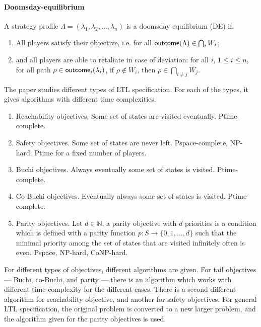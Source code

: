 \documentclass[format=acmsmall, review=false]{acmart}
\newcommand{\outcome}{\textnormal{\textsf{outcome}}}
\newcommand{\nat}{\mathbb{N}}
\begin{document}
\paragraph{{\bf Doomsday-equilibrium}} A strategy profile $\Lambda=(\lambda_1,\lambda_2,\dots,\lambda_n)$ is a doomsday equilibrium (DE) if:
\begin{enumerate}
  \item All players satisfy their objective, i.e. for all $\outcome(\Lambda) \in \bigcap_i W_i$;

  \item and all players are able to retaliate in case of deviation: for all $i$, $1 \leq i \leq n$, for all path $\rho\in \outcome_i(\lambda_i)$, if
    $\rho\not\in W_i$, then $\rho \in \bigcap_{i\neq j} \overline{W_j}$. 

\end{enumerate}

The paper studies different types of LTL specification. For each of the types, it gives algorithms with different time complexities.
\begin{enumerate}
  \item Reachability objectives. Some set of states are visited eventually. Ptime-complete.
  \item Safety objectives. Some set of states are never left. Pspace-complete, NP-hard. Ptime for a fixed number of players.
  \item Buchi objectives. Always eventually some set of states is visited. Ptime-complete.
  \item Co-Buchi objectives. Eventually always some set of states is visited. Ptime-complete.
  \item Parity objectives. Let $d \in \nat$, a parity objective with $d$ priorities is a condition which is defined with a parity function $ p: S \rightarrow  \{0,1,\dots,d\}$ such that the minimal priority among the set of states that are visited infinitely often is even. Pspace, NP-hard, CoNP-hard.
\end{enumerate}

For different types of objectives, different algorithms are given. For tail objectives --- Buchi, co-Buchi, and parity --- there is an algorithm which works with different time complexity for the different cases. There is a second different algorithm for reachability objective, and another for safety objectives. For general LTL specification, the original problem is converted to a new larger problem, and the algorithm given for the parity objectives is used.
\end{document}
